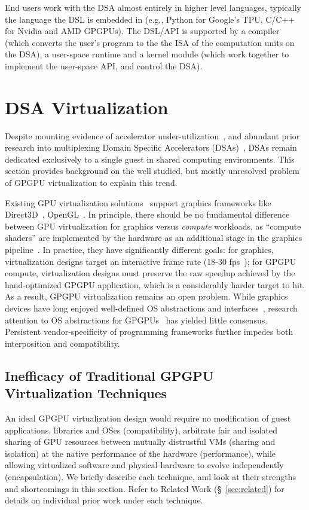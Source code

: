 End users work with the DSA almost entirely in higher level languages,
typically the language the DSL is embedded in (e.g., Python for Google's TPU,
C/C++ for Nvidia and AMD GPGPUs). The DSL/API is supported by a compiler
(which converts the user's program to the the ISA of the computation units on
the DSA), a user-space runtime and a kernel module (which work together to
implement the user-space API, and control the DSA).

\section{DSA Virtualization}

Despite mounting evidence of accelerator under-utilization~\cite{
underutilizingcloud, simultaneous_multikernel,improving_gpu,gpl,fiddle},
and abundant prior research into multiplexing Domain Specific Accelerators
(DSAs)~\cite{gpl,fiddle,zhang2018g, simultaneous_multikernel,improving_gpu,
yeh2017pagoda}, DSAs remain dedicated exclusively to a single guest in shared
computing environments. This section provides background on the well studied,
but mostly unresolved problem of GPGPU virtualization to explain this trend.

Existing GPU virtualization solutions~\cite{dowty2009gpu, VGML} support
graphics frameworks like Direct3D~\cite{directX}, OpenGL~\cite{openGLspec}.
In principle, there should be no fundamental difference between GPU
virtualization for graphics versus \emph{compute} workloads, as ``compute
shaders'' are implemented by the hardware as an additional stage in the
graphics pipeline~\cite{gpu_shader}.
In practice, they have significantly different goals:
for graphics, virtualization designs target an interactive frame rate (18-30
fps~\cite{frame_rate}); for GPGPU compute, virtualization designs must
preserve the raw speedup achieved by the hand-optimized GPGPU application,
which is a considerably harder target to hit. As a result, GPGPU virtualization
remains an open problem. While graphics devices have long enjoyed well-defined
OS abstractions and interfaces~\cite{winGDI}, research attention to OS
abstractions for GPGPUs~\cite{rossbach2011ptask, dandelion,
silberstein2013gpufs, timegraph, gdev, gpunet} has yielded little consensus.
Persistent vendor-specificity of programming frameworks further impedes both
interposition and compatibility.

\subsection{Inefficacy of Traditional GPGPU Virtualization Techniques}
An ideal GPGPU virtualization design would require no modification of
guest applications, libraries and OSes (compatibility), arbitrate fair and
isolated sharing of GPU resources between mutually distrustful VMs (sharing
and isolation) at the native performance of the hardware (performance), while
allowing virtualized software and physical hardware to evolve independently
(encapsulation).
We briefly describe each technique, and look at their strengths and
shortcomings in this section. Refer to Related Work (\S~\ref{sec:related}) for
details on individual prior work under each technique.

